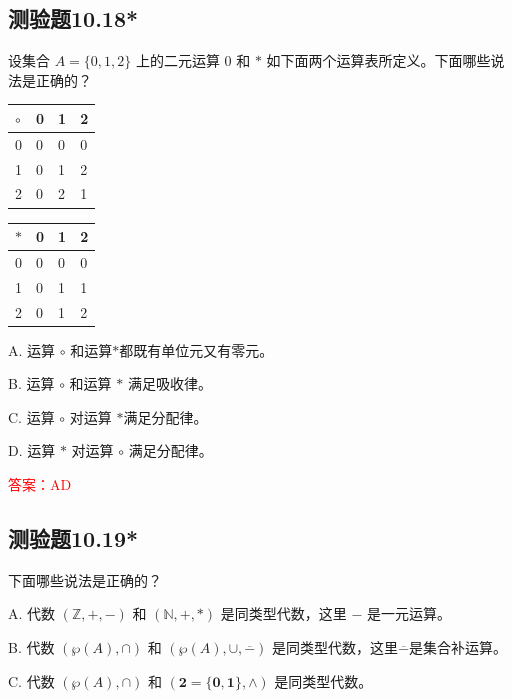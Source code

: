 \documentclass[UTF8, heading=true]{ctexart}
\begin{document}
\subsection{测验题10.18*}

设集合 $A=\{0,1,2\}$ 上的二元运算 0 和 $*$ 如下面两个运算表所定义。下面哪些说法是正确的？
  \begin{table}[H]
    \renewcommand{\arraystretch}{1.5}
    \centering
\begin{minipage}{0.45\textwidth}

  \begin{tabular}{l|lll}
  \hline
  $\circ$ & 0 & 1 & 2 \\
  \hline
  0 & 0 & 0 & 0 \\
  1 & 0 & 1 & 2 \\
  2 & 0 & 2 & 1 \\
  \hline
  \end{tabular}
\end{minipage}
\begin{minipage}{0.45\textwidth}
  \begin{tabular}{l|lll}
  \hline
  $*$ & 0 & 1 & 2 \\
  \hline
  0 & 0 & 0 & 0 \\
  1 & 0 & 1 & 1 \\
  2 & 0 & 1 & 2 \\
  \hline
  \end{tabular}

\end{minipage}
\end{table}
A. 运算 $\circ$ 和运算$*$都既有单位元又有零元。

B. 运算 $\circ$ 和运算 $*$ 满足吸收律。

C. 运算 $\circ$ 对运算 $*$满足分配律。

D. 运算 $*$ 对运算 $\circ$ 满足分配律。

\textcolor{red}{答案：AD}

\subsection{测验题10.19*}

下面哪些说法是正确的？

A. 代数 $(\mathbb{Z},+,-)$ 和 $(\mathbb{N},+, *)$ 是同类型代数，这里 $-$ 是一元运算。

B. 代数 $(\wp(A), \cap)$ 和 $(\wp(A), \cup, \overline{-})$ 是同类型代数，这里$\overline{-}$是集合补运算。

C. 代数 $(\wp(A), \cap)$ 和 $(\mathbf{2}=\{\mathbf{0}, \mathbf{1}\}, \wedge)$ 是同类型代数。
\end{document}
